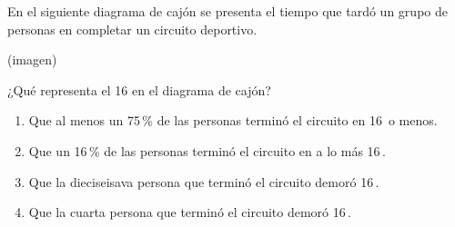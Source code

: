 \begin{problem}
    En el siguiente diagrama de cajón se presenta el tiempo que tardó un grupo de personas en completar un circuito deportivo.

    \begin{center}
    (imagen)
    \end{center}

    ¿Qué representa el 16 en el diagrama de cajón?

    \begin{enumerate}[label=\Alph*.]
        \item Que al menos un 75\,\% de las personas terminó el circuito en 16\, o menos.
        \item Que un 16\,\% de las personas terminó el circuito en a lo más 16\,.
        \item Que la dieciseisava persona que terminó el circuito demoró 16\,.
        \item Que la cuarta persona que terminó el circuito demoró 16\,.
    \end{enumerate}
\end{problem}
